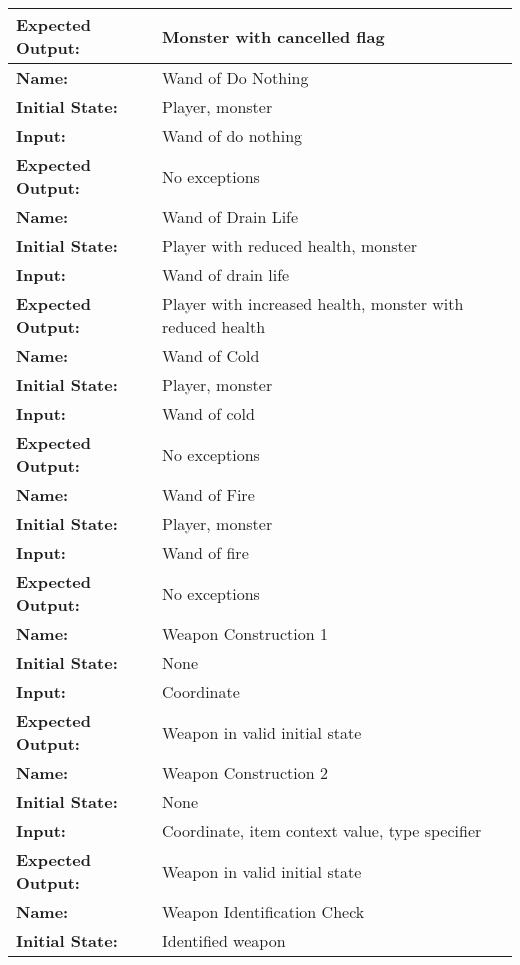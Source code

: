 \documentclass[12pt, titlepage]{article}
\begin{document}
\begin{center}
\begin{longtable}{ l | p{10cm} }
				\textbf{Expected Output:} & Monster with cancelled flag\\[1em]
				\hline
				\rule{0pt}{2em}\textbf{Name:} & Wand of Do Nothing\\
				\textbf{Initial State:} & Player, monster\\
				\textbf{Input:} & Wand of do nothing\\
				\textbf{Expected Output:} & No exceptions\\[1em]
				\hline
				\rule{0pt}{2em}\textbf{Name:} & Wand of Drain Life\\
				\textbf{Initial State:} & Player with reduced health, monster\\
				\textbf{Input:} & Wand of drain life\\
				\textbf{Expected Output:} & Player with increased health, monster with reduced health\\[1em]
				\hline
				\rule{0pt}{2em}\textbf{Name:} & Wand of Cold\\
				\textbf{Initial State:} & Player, monster\\
				\textbf{Input:} & Wand of cold\\
				\textbf{Expected Output:} & No exceptions\\[1em]
				\hline
				\rule{0pt}{2em}\textbf{Name:} & Wand of Fire\\
				\textbf{Initial State:} & Player, monster\\
				\textbf{Input:} & Wand of fire\\
				\textbf{Expected Output:} & No exceptions\\[1em]
				\hline
				\rule{0pt}{2em}\textbf{Name:} & Weapon Construction 1\\
				\textbf{Initial State:} & None\\
				\textbf{Input:} & Coordinate\\
				\textbf{Expected Output:} & Weapon in valid initial state\\[1em]
				\hline
				\rule{0pt}{2em}\textbf{Name:} & Weapon Construction 2\\
				\textbf{Initial State:} & None\\
				\textbf{Input:} & Coordinate, item context value, type specifier\\
				\textbf{Expected Output:} & Weapon in valid initial state\\[1em]
				\hline
				\rule{0pt}{2em}\textbf{Name:} & Weapon Identification Check\\
				\textbf{Initial State:} & Identified weapon\\

\end{longtable}
\end{center}
\end{document}
